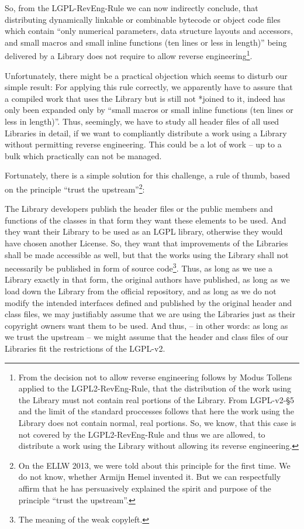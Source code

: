 So, from the LGPL-RevEng-Rule we can now indirectly conclude, that distributing
dynamically linkable or combinable bytecode or object code files which contain
\enquote{only numerical parameters, data structure layouts and accessors, and
small macros and small inline functions (ten lines or less in length)} being
delivered by a Library does not require to allow reverse
engineering\footnote{From the decision not to allow reverse engineering follows
by Modus Tollens applied to the LGPL2-RevEng-Rule, that the distribution of the
work using the Library must not contain real portions of the Library. From
LGPL-v2-§5 and the limit of the standard proccesses follows that here the work
using the Library does not contain normal, real portions. So, we know, that this
case is not covered by the LGPL2-RevEng-Rule and thus we are allowed, to
distribute a work using the Library without allowing its reverse engineering.}.

Unfortunately, there might be a practical objection which seems to disturb our
simple result: For applying this rule correctly, we apparently have to assure
that a compiled work that uses the Library but is still not *joined to it,
indeed has only been expanded only by \enquote{small macros or small inline
functions (ten lines or less in length)}. Thus, seemingly, we have to study all
header files of all used Libraries in detail, if we want to compliantly
distribute a work using a Library without permitting reverse engineering. This
could be a lot of work -- up to a bulk which practically can not be managed.

Fortunately, there is a simple solution for this challenge, a rule of thumb,
based on the principle \enquote{trust the upstream}\footnote{On the ELLW 2013,
we were told about this principle for the first time. We do not know, whether
Armijn Hemel invented it. But we can respectfully affirm that he has
persuasively explained the spirit and purpose of the principle \enquote{trust
the upstream}.}:

The Library developers publish the header files or the public members and
functions of the classes in that form they want these elements to be used.
And they want their Library to be used as an LGPL library, otherwise they would
have chosen another License. So, they want that improvements of the Libraries
shall be made accessible as well, but that the works using the Library shall not
necessarily be published in form of source code\footnote{The meaning of the weak
copyleft.}. Thus, as long as we use a Library exactly in that form, the original
authors have published, as long as we load down the Library from the official
repository, and as long as we do not modify the intended interfaces defined and
published by the original header and class files, we may justifiably assume that
we are using the Libraries just as their copyright owners want them to be used.
And thus, -- in other words: as long as we trust the upstream -- we might assume
that the header and class files of our Libraries fit the restrictions of the
LGPL-v2.

